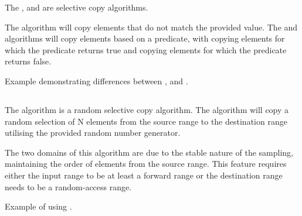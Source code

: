 The ,  and  are selective copy algorithms.



The  algorithm will copy elements that do not match the provided value. The  and  algorithms will copy elements based on a predicate, with  copying elements for which the predicate returns true and  copying elements for which the predicate returns false.

\begin{box-note}
\footnotesize Example demonstrating differences between ,  and .
\tcblower
{}
\end{box-note}

\subsection{\texorpdfstring{}{\texttt{std::sample}}}

The  algorithm is a random selective copy algorithm. The algorithm will copy a random selection of N elements from the source range to the destination range utilising the provided random number generator.


The two domains of this algorithm are due to the stable nature of the sampling, maintaining the order of elements from the source range. This feature requires either the input range to be at least a forward range or the destination range needs to be a random-access range.

\begin{box-note}
\footnotesize Example of using .
\tcblower
{}
\end{box-note}

